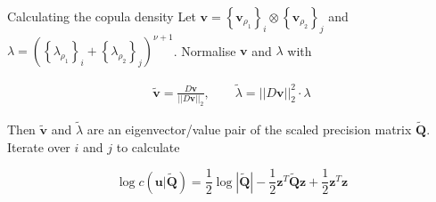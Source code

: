 \documentclass[
  ignorenonframetext,
]{beamer}
\begin{document}
\begin{frame}{Calculating the copula density}
\label{calculating-the-copula-density}
Let
\(\mathbf v = \left\{\mathbf{v}_{\rho_1}\right\}_i \otimes \left\{\mathbf{v}_{\rho_2}\right\}_j\)
and
\(\lambda = \left(\left\{\lambda_{\rho_1}\right\}_i + \left\{\lambda_{\rho_2}\right\}_j\right)^{\nu + 1}\).
Normalise \(\mathbf v\) and \(\lambda\) with

\[
\begin{gathered}
\widetilde{\mathbf{v}} = \frac{D\mathbf{v}}{\vert\vert D\mathbf{v}\vert\vert_2}, \qquad
\widetilde{\lambda} = \vert\vert D\mathbf{v}\vert\vert_2^2 \cdot \lambda
\end{gathered}
\]

Then \(\widetilde{\mathbf{v}}\) and \(\widetilde{\lambda}\) are an
eigenvector/value pair of the scaled precision matrix
\(\mathbf{\widetilde{Q}}\). Iterate over \(i\) and \(j\) to calculate

\[
\log c(\mathbf{u} \vert \mathbf{\widetilde{Q}}) = \frac{1}{2}\log|\mathbf{\widetilde Q}| - \frac{1}{2}\mathbf{z}^T\mathbf{\widetilde Q}\mathbf{z} + \frac{1}{2}\mathbf{z}^T\mathbf{z}
\]
\end{frame}
\end{document}
